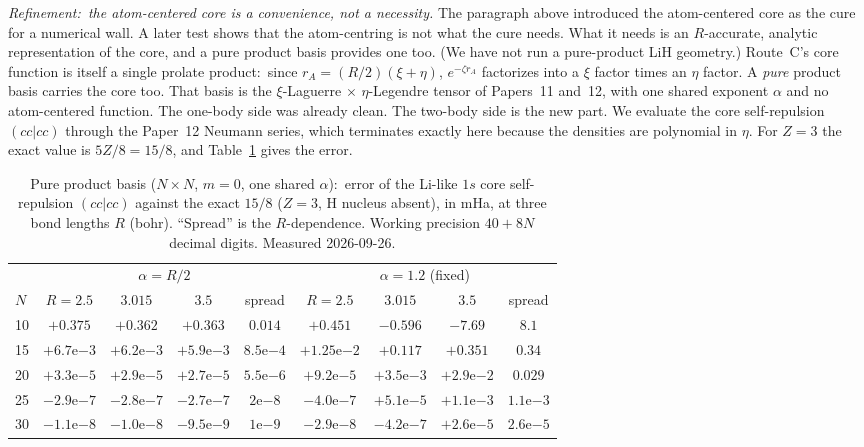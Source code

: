 \documentclass[aps,pra,twocolumn,superscriptaddress,longbibliography]{revtex4-2}
\begin{document}
\emph{Refinement:\ the atom-centered core is a convenience, not a necessity.}
The paragraph above introduced the atom-centered core as the cure for a numerical
wall.  A later test shows that the atom-centring is not what the cure needs.
What it needs is an $R$-accurate, analytic representation of the core, and a
pure product basis provides one too.  (We have not run a pure-product LiH
geometry.)  Route~C's core function is itself a single prolate product:\
since $r_A=(R/2)(\xi+\eta)$, $e^{-\zeta r_A}$ factorizes into a $\xi$ factor
times an $\eta$ factor.  A \emph{pure} product basis carries the core too.  That
basis is the $\xi$-Laguerre$\,\times\,\eta$-Legendre tensor of Papers~11 and~12,
with one shared exponent $\alpha$ and no atom-centered function.  The one-body
side was already clean.  The two-body side is the new part.  We evaluate the
core self-repulsion $(cc|cc)$ through the Paper~12 Neumann series, which
terminates exactly here because the densities are polynomial in $\eta$.  For
$Z=3$ the exact value is $5Z/8=15/8$, and Table~\ref{tab:pure_product_core}
gives the error.
\begin{table}[t]
\caption{Pure product basis ($N\times N$, $m=0$, one shared $\alpha$):\ error
of the Li-like $1s$ core self-repulsion $(cc|cc)$ against the exact $15/8$
($Z=3$, H nucleus absent), in mHa, at three bond lengths $R$ (bohr).  ``Spread''
is the $R$-dependence.  Working precision $40+8N$ decimal digits.  Measured
2026-09-26.}
\label{tab:pure_product_core}
\begin{ruledtabular}
\begin{tabular}{lcccccccc}
 & \multicolumn{4}{c}{$\alpha=R/2$} & \multicolumn{4}{c}{$\alpha=1.2$ (fixed)} \\
$N$ & $R{=}2.5$ & $3.015$ & $3.5$ & spread & $R{=}2.5$ & $3.015$ & $3.5$ & spread \\
\hline
10 & $+0.375$ & $+0.362$ & $+0.363$ & $0.014$ & $+0.451$ & $-0.596$ & $-7.69$ & $8.1$ \\
15 & $+6.7\mathrm{e}{-3}$ & $+6.2\mathrm{e}{-3}$ & $+5.9\mathrm{e}{-3}$ & $8.5\mathrm{e}{-4}$ & $+1.25\mathrm{e}{-2}$ & $+0.117$ & $+0.351$ & $0.34$ \\
20 & $+3.3\mathrm{e}{-5}$ & $+2.9\mathrm{e}{-5}$ & $+2.7\mathrm{e}{-5}$ & $5.5\mathrm{e}{-6}$ & $+9.2\mathrm{e}{-5}$ & $+3.5\mathrm{e}{-3}$ & $+2.9\mathrm{e}{-2}$ & $0.029$ \\
25 & $-2.9\mathrm{e}{-7}$ & $-2.8\mathrm{e}{-7}$ & $-2.7\mathrm{e}{-7}$ & $2\mathrm{e}{-8}$ & $-4.0\mathrm{e}{-7}$ & $+5.1\mathrm{e}{-5}$ & $+1.1\mathrm{e}{-3}$ & $1.1\mathrm{e}{-3}$ \\
30 & $-1.1\mathrm{e}{-8}$ & $-1.0\mathrm{e}{-8}$ & $-9.5\mathrm{e}{-9}$ & $1\mathrm{e}{-9}$ & $-2.9\mathrm{e}{-8}$ & $-4.2\mathrm{e}{-7}$ & $+2.6\mathrm{e}{-5}$ & $2.6\mathrm{e}{-5}$ \\
\end{tabular}
\end{ruledtabular}
\end{table}
\end{document}
